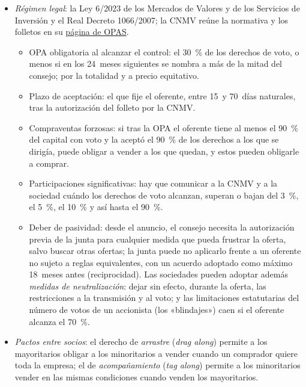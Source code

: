 \documentclass[11pt]{article}
\begin{document}
\begin{itemize}
\item \emph{Régimen legal}: la Ley 6/2023 de los Mercados de Valores y de los Servicios de Inversión y el Real Decreto 1066/2007\nocite{BOE2023LMV,BOE2007OPA}; la CNMV reúne la normativa y los folletos en su \href{https://www.cnmv.es/Portal/Gpage.aspx?id=Libro4_Opas}{página de OPAS}.
  \begin{itemize}
  \item OPA obligatoria al alcanzar el control: el 30~\% de los derechos de voto, o menos si en los 24~meses siguientes se nombra a más de la mitad del consejo; por la totalidad y a precio equitativo.
  \item Plazo de aceptación: el que fije el oferente, entre 15~y 70~días naturales, tras la autorización del folleto por la CNMV.
  \item Compraventas forzosas: si tras la OPA el oferente tiene al menos el 90~\% del capital con voto y la aceptó el 90~\% de los derechos a los que se dirigía, puede obligar a vender a los que quedan, y estos pueden obligarle a comprar.
  \item Participaciones significativas: hay que comunicar a la CNMV y a la sociedad cuándo los derechos de voto alcanzan, superan o bajan del 3~\%, el 5~\%, el 10~\% y así hasta el 90~\%\nocite{BOE2007Transparencia}.
  \item Deber de pasividad: desde el anuncio, el consejo necesita la autorización previa de la junta para cualquier medida que pueda frustrar la oferta, salvo buscar otras ofertas; la junta puede no aplicarlo frente a un oferente no sujeto a reglas equivalentes, con un acuerdo adoptado como máximo 18~meses antes (reciprocidad). Las sociedades pueden adoptar además \emph{medidas de neutralización}: dejar sin efecto, durante la oferta, las restricciones a la transmisión y al voto; y las limitaciones estatutarias del número de votos de un accionista (los «blindajes») caen si el oferente alcanza el 70~\%\nocite{BOE2023LMV}.
  \end{itemize}
\item \emph{Pactos entre socios}: el derecho de \emph{arrastre} (\emph{drag along}) permite a los mayoritarios obligar a los minoritarios a vender cuando un comprador quiere toda la empresa; el de \emph{acompañamiento} (\emph{tag along}) permite a los minoritarios vender en las mismas condiciones cuando venden los mayoritarios.
\end{itemize}

\end{document}
